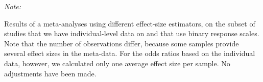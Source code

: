 \documentclass[
  doc,floatsintext]{apa6}
\begin{document}
\begin{table}
\centering\centering
\caption{\label{tab:meta-odds}Individual-level studies with binary response scale}
\centering
\begin{threeparttable}
\begin{tablenotes}
\item \textit{Note: } 
\item Results of a meta-analyses using different effect-size estimators, on the subset of studies that we have individual-level data on and that use binary response scales.  Note that the number of observations differ, because some samples provide several effect sizes in the meta-data. For the odds ratios based on the individual data, however, we calculated only one average effect size per sample. No adjustments have been made.
\end{tablenotes}
\end{threeparttable}
\end{table}
\end{document}
